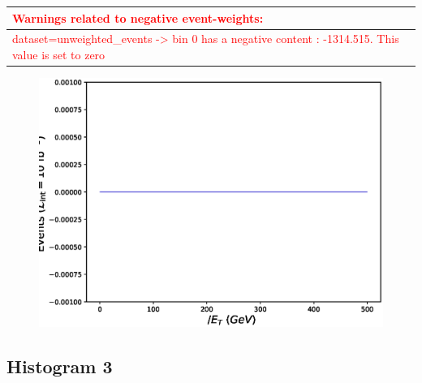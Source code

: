 \documentclass[a4paper, 10pt]{article}
\begin{document}
\begin{table}[H]
  \begin{center}
    \begin{tabular}{|m{140.0mm}|}
      \hline
      {\cellcolor{white}\textcolor{red}{Warnings related to negative event-weights:}}\\
      \hline
      {\cellcolor{white}\textcolor{red}{dataset=unweighted\_events -> bin 0 has a negative content : -1314.515. This value is set to zero}}\\
      \hline
\hline
    \end{tabular}
  \end{center}
\end{table}

\begin{figure}[H]
  \begin{center}
    \includegraphics[scale=0.45]{selection_1.eps}\\
\caption{   }
  \end{center}
\end{figure}
      \newpage
\subsection{ Histogram 3}
\end{document}
